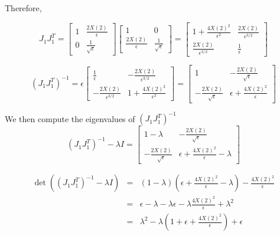 \documentclass[12pt]{article}
\begin{document}
Therefore,

\begin{equation}
J_1 J_1^T =
\begin{bmatrix} 1 & \frac{2X(2)}{\epsilon} \\ 0 & \frac{1}{\sqrt{\epsilon}} \end{bmatrix} 
\begin{bmatrix} 1 & 0 \\ \frac{2X(2)}{\epsilon} & \frac{1}{\sqrt{\epsilon}} \end{bmatrix}
= \begin{bmatrix}
1+\frac{4 X(2)^2}{\epsilon^2} & \frac{2X(2)}{\epsilon^{3/2}} \\
\frac{2X(2)}{\epsilon^{3/2}} & \frac{1}{\epsilon}
\end{bmatrix}
\end{equation}

\begin{equation}
\left( J_1 J_1^T \right)^{-1} = 
\epsilon \begin{bmatrix}
\frac{1}{\epsilon} & -\frac{2X(2)}{\epsilon^{3/2}} \\
-\frac{2X(2)}{\epsilon^{3/2}} & 1+\frac{4  X(2)^2}{\epsilon^2}
\end{bmatrix}
= \begin{bmatrix}
1 & -\frac{2X(2)}{\sqrt{\epsilon}} \\
-\frac{2X(2)}{\sqrt{\epsilon}} & \epsilon+\frac{4 X(2)^2}{\epsilon}
\end{bmatrix}
\end{equation}

We then compute the eigenvalues of $(J_1 J_1^T)^{-1}$
\begin{equation}
\left( J_1 J_1^T \right)^{-1} - \lambda I =
\begin{bmatrix}
1-\lambda & -\frac{2X(2)}{\sqrt{\epsilon}} \\
-\frac{2X(2)}{\sqrt{\epsilon}} & \epsilon+\frac{4 X(2)^2}{\epsilon}-\lambda
\end{bmatrix}
\end{equation}

\begin{eqnarray}
\det \left( \left( J_1 J_1^T \right)^{-1} - \lambda I \right) &=& 
\left(1-\lambda \right) \left( \epsilon+\frac{4 X(2)^2}{\epsilon}-\lambda \right) - \frac{4 X(2)^2 }{\epsilon} \\
&=& \epsilon - \lambda  - \lambda \epsilon - \lambda \frac{4 X(2)^2}{\epsilon} + \lambda^2 \\
&=& \lambda^2 - \lambda \left( 1 + \epsilon + \frac{4 X(2)^2}{\epsilon} \right) + \epsilon
\end{eqnarray}
\end{document}
